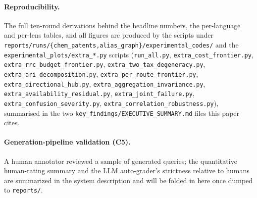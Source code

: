 \documentclass[11pt]{article}
\begin{document}
\paragraph{Reproducibility.}
\label{app:repro}
The full ten-round derivations behind the headline numbers, the per-language and
per-lens tables, and all figures are produced by the scripts under
\texttt{reports/runs/\{chem\_patents,alias\_graph\}/experimental\_codes/} and the
\texttt{experimental\_plots/extra\_*.py} scripts (\texttt{run\_all.py},
\texttt{extra\_cost\_frontier.py}, \texttt{extra\_rrc\_budget\_frontier.py},
\texttt{extra\_two\_tax\_degeneracy.py}, \texttt{extra\_ari\_decomposition.py},
\texttt{extra\_per\_route\_frontier.py}, \texttt{extra\_directional\_hub.py},
\texttt{extra\_aggregation\_invariance.py},
\texttt{extra\_availability\_residual.py}, \texttt{extra\_joint\_failure.py},
\texttt{extra\_confusion\_severity.py},
\texttt{extra\_correlation\_robustness.py}), summarised in the two
\texttt{key\_findings/EXECUTIVE\_SUMMARY.md} files this paper cites.

\paragraph{Generation-pipeline validation (C5).}
A human annotator reviewed a sample of generated queries; the quantitative
human-rating summary and the LLM auto-grader's strictness relative to humans are
summarized in the system description and will be folded in here once dumped to
\texttt{reports/}.
\end{document}
